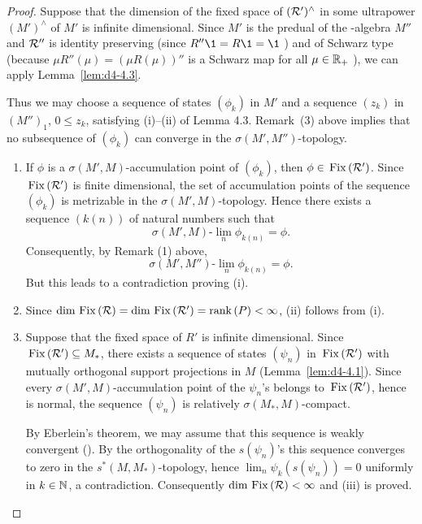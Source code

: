\begin{proof}
Suppose that the dimension of the fixed space of\/ 
$ (\mathcal{R}')^{\wedge} $  in some ultrapower $ (M')^{\wedge} $  of $ M' $  is infinite dimensional.
Since $ M' $ is the predual of the \WA-algebra $ M'' $  and $ \mathcal{R}'' $  is identity preserving (since $ R''\1 = R\1 = \1 $ ) and of Schwarz type (because $ \mu R''(\mu) = (\mu R(\mu))'' $  is a Schwarz map for all $ \mu \in \mathbb{R}_{+} $ ), we can apply Lemma~\ref{lem:d4-4.3}.

Thus we may choose a sequence of states $ (\phi_{k}) $  in $ M' $  and a sequence $ (z_{k}) $  in $ (M'')_{1}$, $ 0 \leq z_{k} $,  satisfying (i)--(ii) of Lemma 4.3.
Remark~(3) above implies that no subsequence of $ (\phi_{k}) $  can converge in the $ \sigma(M',M'') $-topology.
\begin{enumerate}[\upshape (i), wide, labelindent=.5em]
\item
If $ \phi $  is a $ \sigma(M',M) $-accumulation point of $ (\phi_{k}) $, then $ \phi \in \mathop{}\mathrm{Fix}\left(\mathcal{R}'\right) $.
Since $ \mathop{}\mathrm{Fix}\left(\mathcal{R}'\right) $  is finite dimensional, the set of accumulation points of the sequence $ (\phi_{k}) $  is metrizable in the $ \sigma(M',M) $-topology.
Hence there exists a sequence $ (k(n)) $  of natural numbers such that 
\[
    \sigma(M',M)\text{-}\lim_{n} \phi_{k(n)} = \phi .
\]
Consequently, by Remark (1) above, 
\[ 
    \sigma(M',M'')\text{-}\lim_{n} \phi_{k(n)}= \phi .
\]
But this leads to a contradiction proving (i).

\item
Since $ \dim \mathop{}\mathrm{Fix}\left(\mathcal{R}\right) = \dim \mathop{}\mathrm{Fix}\left(\mathcal{R}'\right) = \mathop{}\!\mathrm{rank}\,(P) < \infty $, (ii) follows from (i).

\item
Suppose that the fixed space of $ R' $  is infinite dimensional.
Since $ \mathop{}\mathrm{Fix}\left(\mathcal{R}'\right) \subseteq M_{*} $,  there exists a sequence of states $ (\psi_{n}) $  in $ \mathop{}\mathrm{Fix}\left(\mathcal{R}'\right) $  with mutually orthogonal support projections in $ M $  (Lemma~\ref{lem:d4-4.1}).
Since every $ \sigma(M',M) $-accumulation point of the $ \psi_{n} $'s belongs to $ \mathop{}\mathrm{Fix}\left(\mathcal{R}'\right) $, hence is normal, the sequence $ (\psi_{n}) $  is relatively $ \sigma(M_{*},M) $-compact.

By Eberlein's theorem, we may assume that this sequence is weakly convergent (\citet{schaefer:1966}).
By the orthogonality of the $ s(\psi_{n}) $'s this sequence converges to zero in the $ s^{*}(M,M_{*}) $-topology, hence $ \lim_{n} \psi_{k}(s(\psi_{n})) = 0 $  uniformly in $ k \in \mathbb{N} $, a contradiction.
Consequently $ \dim \mathop{}\mathrm{Fix}\left(\mathcal{R}\right) < \infty $  and (iii) is proved.


\end{enumerate}
\end{proof}
